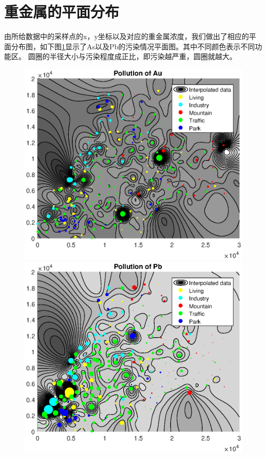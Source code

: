 \documentclass[a4paper]{article}
\begin{document}
\section{重金属的平面分布}
由所给数据中的采样点的x，y坐标以及对应的重金属浓度，我们做出了相应的平面分布图，如下图\ref{fig:char}显示了As以及Pb的污染情况平面图。其中不同颜色表示不同功能区。
圆圈的半径大小与污染程度成正比，即污染越严重，圆圈就越大。
\begin{figure}[h]
	\begin{minipage}[t]{0.5\linewidth}
    \centering
    \includegraphics[scale=0.4]{pictures/pollution-of-Au.eps}
    \end{minipage}
    \begin{minipage}[t]{0.5\linewidth}
    \centering 
	\includegraphics[scale=0.4]{pictures/pollution-of-Pb.eps}
    \end{minipage}
    \label{fig:char}
\end{figure}
\end{document}

